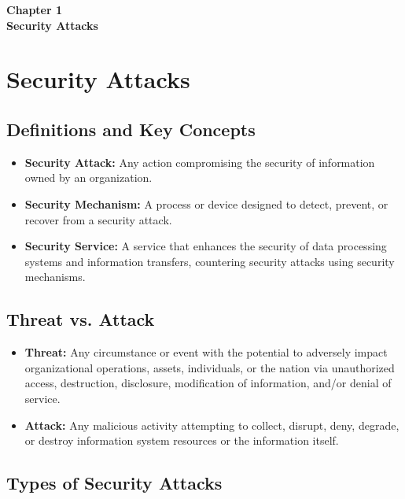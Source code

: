 \clearpage
\thispagestyle{empty} 
\begin{center}
    \vspace*{\fill} 
    \Huge \textbf{Chapter 1} \\
    \Huge \textbf{Security Attacks}
    \vspace*{\fill}
\end{center}
\clearpage

\chapter{Security Attacks}

\section{Definitions and Key Concepts}
\begin{itemize}
    \item \textbf{Security Attack:} Any action compromising the security of information owned by an organization.
    \item \textbf{Security Mechanism:} A process or device designed to detect, prevent, or recover from a security attack.
    \item \textbf{Security Service:} A service that enhances the security of data processing systems and information transfers, countering security attacks using security mechanisms.
\end{itemize}

\section{Threat vs. Attack}
\begin{itemize}
    \item \textbf{Threat:} Any circumstance or event with the potential to adversely impact organizational operations, assets, individuals, or the nation via unauthorized access, destruction, disclosure, modification of information, and/or denial of service.
    \item \textbf{Attack:} Any malicious activity attempting to collect, disrupt, deny, degrade, or destroy information system resources or the information itself.
\end{itemize}

\section{Types of Security Attacks}

